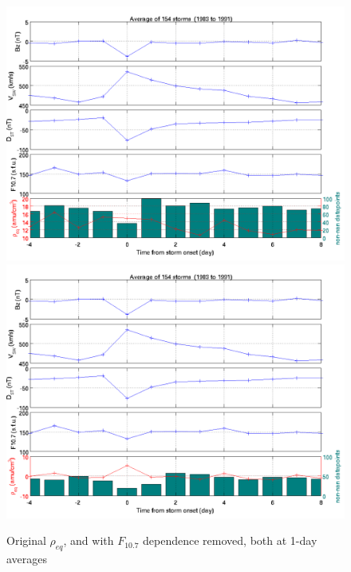 \documentclass[10pt,twocolumn]{article}
\begin{document}
\begin{figure}[htp!]
\centering
\includegraphics[scale=0.35]{paperfigures/stormavs-dst-day.png}
\includegraphics[scale=0.35]{paperfigures/stormavs-dst-day-nof107.png}
\caption{Original $\rho_{eq}$, and with $F_{10.7}$ dependence removed, both at 1-day averages}
\label{nof107day}
\end{figure}

\newpage
\footnotesize



\end{document}
